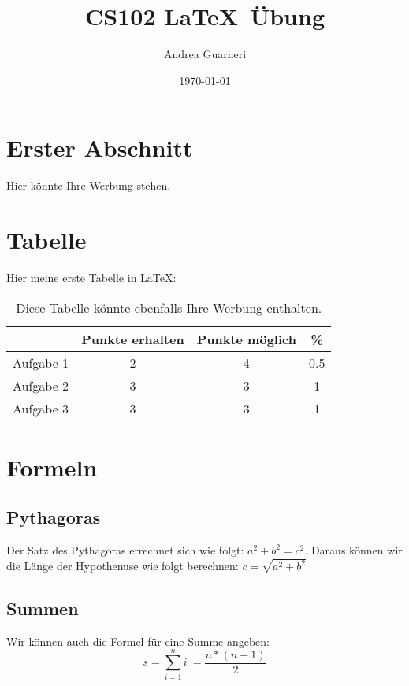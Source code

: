 \documentclass{article}
\begin{document}
\title{CS102 \LaTeX  \, Übung}
\author{Andrea Guarneri}
\date{\today}
\maketitle

\section{Erster Abschnitt}
Hier könnte Ihre Werbung stehen.

\section{Tabelle}
Hier meine erste Tabelle in \LaTeX : \\
\begin{table}[h]
\centering
\begin{tabular}{c|c|c|c}
& Punkte erhalten & Punkte möglich & \% \\
 \hline Aufgabe 1 & 2 & 4 & 0.5 \\
 Aufgabe 2 & 3 & 3 & 1 \\
 Aufgabe 3 & 3 & 3 & 1 \\
 \end{tabular}
 
\caption{Diese Tabelle könnte ebenfalls Ihre Werbung enthalten.}
\end{table}

\section{Formeln}
\subsection{Pythagoras}
Der Satz des Pythagoras errechnet sich wie folgt: $a^2 + b^2 = c^2 $. Daraus können wir die Länge der Hypothenuse wie folgt berechnen: $c = \sqrt{a^2+b^2}$

\subsection{Summen}
Wir können auch die Formel für eine Summe angeben:
\begin{equation}
s = \sum_{i=1}^n i\ = \frac{n*(n+1)}{2}
\end{equation}
\end{document}

